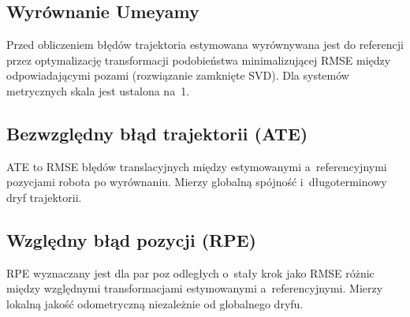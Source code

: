 \subsection{Wyrównanie Umeyamy}

Przed obliczeniem błędów trajektoria estymowana wyrównywana jest do referencji
przez optymalizację transformacji podobieństwa minimalizującej RMSE między
odpowiadającymi pozami (rozwiązanie zamknięte SVD).
Dla systemów metrycznych skala jest ustalona na~1.

\subsection{Bezwzględny błąd trajektorii (ATE)}

ATE to RMSE błędów translacyjnych między estymowanymi a~referencyjnymi
pozycjami robota po wyrównaniu.
Mierzy globalną spójność i~długoterminowy dryf trajektorii.

\subsection{Względny błąd pozycji (RPE)}

RPE wyznaczany jest dla par poz odległych o~stały krok jako RMSE różnic
między względnymi transformacjami estymowanymi a~referencyjnymi.
Mierzy lokalną jakość odometryczną niezależnie od globalnego dryfu.
